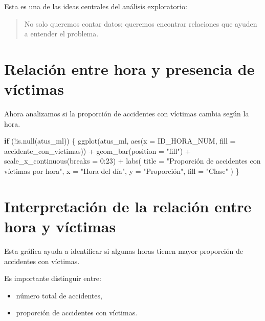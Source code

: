 \documentclass[
  11pt,
  letterpaper,
]{book}
\newenvironment{Shaded}{\begin{snugshade}}{\end{snugshade}}
\newcommand{\AttributeTok}[1]{\textcolor[rgb]{0.40,0.45,0.13}{#1}}
\newcommand{\ControlFlowTok}[1]{\textcolor[rgb]{0.00,0.23,0.31}{\textbf{#1}}}
\newcommand{\DecValTok}[1]{\textcolor[rgb]{0.68,0.00,0.00}{#1}}
\newcommand{\FunctionTok}[1]{\textcolor[rgb]{0.28,0.35,0.67}{#1}}
\newcommand{\NormalTok}[1]{\textcolor[rgb]{0.00,0.23,0.31}{#1}}
\newcommand{\SpecialCharTok}[1]{\textcolor[rgb]{0.37,0.37,0.37}{#1}}
\newcommand{\StringTok}[1]{\textcolor[rgb]{0.13,0.47,0.30}{#1}}
\providecommand{\tightlist}{%
  \setlength{\itemsep}{0pt}\setlength{\parskip}{0pt}}
\begin{document}
Esta es una de las ideas centrales del análisis exploratorio:

\begin{quote}
No solo queremos contar datos; queremos encontrar relaciones que ayuden
a entender el problema.
\end{quote}

\section{Relación entre hora y presencia de
víctimas}\label{relaciuxf3n-entre-hora-y-presencia-de-vuxedctimas}

Ahora analizamos si la proporción de accidentes con víctimas cambia
según la hora.

\begin{Shaded}
\begin{Highlighting}[]
\ControlFlowTok{if}\NormalTok{ (}\SpecialCharTok{!}\FunctionTok{is.null}\NormalTok{(atus\_ml)) \{}
  \FunctionTok{ggplot}\NormalTok{(atus\_ml, }\FunctionTok{aes}\NormalTok{(}\AttributeTok{x =}\NormalTok{ ID\_HORA\_NUM, }\AttributeTok{fill =}\NormalTok{ accidente\_con\_victimas)) }\SpecialCharTok{+}
    \FunctionTok{geom\_bar}\NormalTok{(}\AttributeTok{position =} \StringTok{"fill"}\NormalTok{) }\SpecialCharTok{+}
    \FunctionTok{scale\_x\_continuous}\NormalTok{(}\AttributeTok{breaks =} \DecValTok{0}\SpecialCharTok{:}\DecValTok{23}\NormalTok{) }\SpecialCharTok{+}
    \FunctionTok{labs}\NormalTok{(}
      \AttributeTok{title =} \StringTok{"Proporción de accidentes con víctimas por hora"}\NormalTok{,}
      \AttributeTok{x =} \StringTok{"Hora del día"}\NormalTok{,}
      \AttributeTok{y =} \StringTok{"Proporción"}\NormalTok{,}
      \AttributeTok{fill =} \StringTok{"Clase"}
\NormalTok{    )}
\NormalTok{\}}
\end{Highlighting}
\end{Shaded}

\section{Interpretación de la relación entre hora y
víctimas}\label{interpretaciuxf3n-de-la-relaciuxf3n-entre-hora-y-vuxedctimas}

Esta gráfica ayuda a identificar si algunas horas tienen mayor
proporción de accidentes con víctimas.

Es importante distinguir entre:

\begin{itemize}
\tightlist
\item
  número total de accidentes,
\item
  proporción de accidentes con víctimas.
\end{itemize}
\end{document}
